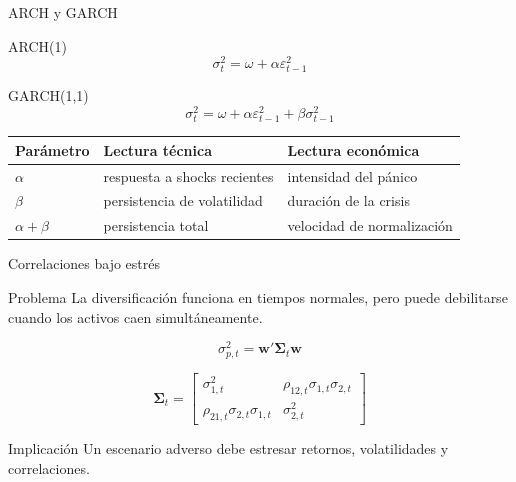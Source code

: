 \documentclass[aspectratio=169,11pt]{beamer}
\begin{document}
\begin{frame}{ARCH y GARCH}
\begin{block}{ARCH(1)}
\[
\sigma_t^2=\omega+\alpha \varepsilon_{t-1}^2
\]
\end{block}

\begin{block}{GARCH(1,1)}
\[
\sigma_t^2=\omega+\alpha \varepsilon_{t-1}^2+\beta\sigma_{t-1}^2
\]
\end{block}

\begin{table}
\centering
\small
\begin{tabular}{lll}
\toprule
\textbf{Parámetro} & \textbf{Lectura técnica} & \textbf{Lectura económica} \\
\midrule
$\alpha$ & respuesta a shocks recientes & intensidad del pánico \\
$\beta$ & persistencia de volatilidad & duración de la crisis \\
$\alpha+\beta$ & persistencia total & velocidad de normalización \\
\bottomrule
\end{tabular}
\end{table}
\end{frame}

\begin{frame}{Correlaciones bajo estrés}
\begin{block}{Problema}
La diversificación funciona en tiempos normales, pero puede debilitarse cuando los activos caen simultáneamente.
\end{block}

\[
\sigma^2_{p,t}=\bm{w}'\bm{\Sigma}_t\bm{w}
\]

\[
\bm{\Sigma}_t=
\begin{bmatrix}
\sigma_{1,t}^2 & \rho_{12,t}\sigma_{1,t}\sigma_{2,t} \\
\rho_{21,t}\sigma_{2,t}\sigma_{1,t} & \sigma_{2,t}^2
\end{bmatrix}
\]

\begin{alertblock}{Implicación}
Un escenario adverso debe estresar retornos, volatilidades y correlaciones.
\end{alertblock}
\end{frame}
\end{document}
